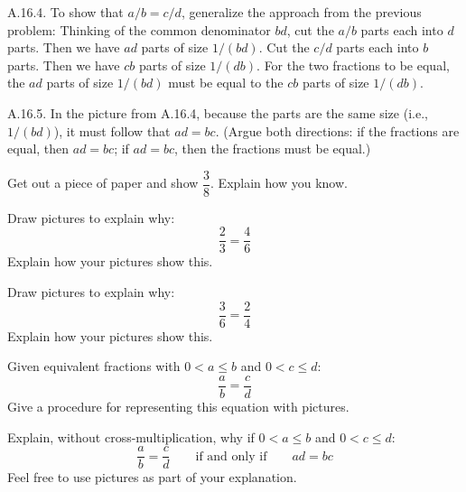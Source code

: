 \begin{teachingnote}
A.16.4.  To show that $a/b = c/d$, generalize the approach from the previous problem:  Thinking of the common denominator $bd$, cut the $a/b$ parts each into $d$ parts.  Then we have $ad$ parts of size $1/(bd)$.  Cut the $c/d$ parts each into $b$ parts.  Then we have $cb$ parts of size $1/(db)$.  For the two fractions to be equal, the $ad$ parts of size $1/(bd)$ must be equal to the $cb$ parts of size $1/(db)$.  

A.16.5.  In the picture from A.16.4, because the parts are the same size (i.e., $1/(bd)$), it must follow that $ad = bc$.  (Argue both directions:  if the fractions are equal, then $ad = bc$;  if $ad = bc$, then the fractions must be equal.)  
\end{teachingnote}

\begin{prob}
Get out a piece of paper and show $\dfrac{3}{8}$.  Explain how you know.  
\end{prob}

\begin{prob} 
Draw pictures to explain why:
\[
\frac{2}{3} = \frac{4}{6}
\]
Explain how your pictures show this.
\end{prob}


\begin{prob} 
Draw pictures to explain why:
\[
\frac{3}{6} = \frac{2}{4}
\]
Explain how your pictures show this.
\end{prob}



\begin{prob} 
Given equivalent fractions with $0< a\le b$ and $0 < c\le d$:
\[
\frac{a}{b} = \frac{c}{d}
\]
Give a procedure for representing this equation with pictures.
\end{prob}


\begin{prob} 
Explain, without cross-multiplication, why if $0< a\le b$ and $0 < c\le d$:
\[
\frac{a}{b} = \frac{c}{d}\qquad \text{if and only if}\qquad ad = bc
\]
Feel free to use pictures as part of your explanation.
\end{prob}
